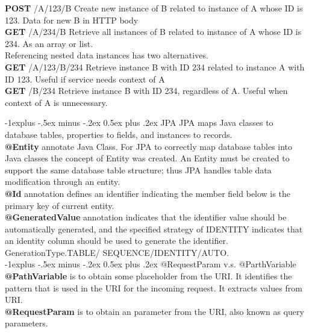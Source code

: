 \documentclass[10pt,landscape]{article}
\makeatletter
\renewcommand{\subsection}{\@startsection{subsection}{2}{0mm}%
                                {-1explus -.5ex minus -.2ex}%
                                {0.5ex plus .2ex}%
                                {\normalfont\normalsize\bfseries}}
\makeatother
\begin{document}
\begin{multicols}{3}
\textbf{POST}	/A/123/B	Create new instance of B related to instance of A whose ID is 123. Data for new B in HTTP body\\
\textbf{GET}		/A/234/B	Retrieve all instances of B related to instance of A whose ID is 234. As an array or list.\\

Referencing nested data instances has two alternatives.\\
\textbf{GET} /A/123/B/234 Retrieve instance B with ID 234 related to instance A with ID 123. Useful if service needs context of A\\
\textbf{GET} /B/234	Retrieve instance B with ID 234, regardless of A. Useful when context of A is unnecessary.


\subsection{JPA}
JPA maps Java classes to database tables, properties to fields, and instances to records.\\

\textbf{@Entity} annotate Java Class. For JPA to correctly map database tables into Java classes the concept of Entity was created. An Entity must be created to support the same database table structure; thus JPA handles table data modification through an entity.\\
\textbf{@Id} annotation defines an identifier indicating the member field below is the primary key of current entity.\\
\textbf{@GeneratedValue} annotation indicates that the identifier value should be automatically generated, and the specified strategy of IDENTITY indicates that an identity column should be used to generate the identifier. GenerationType.TABLE/ SEQUENCE/IDENTITY/AUTO.\\

\subsection{@RequestParam v.s. @ParthVariable}
\textbf{@PathVariable} is to obtain some placeholder from the URI. It identifies the pattern that is used in the URI for the incoming request. It extracts values from URI.\\
\textbf{@RequestParam} is to obtain an parameter from the URI, also known as query parameters. \\


\end{multicols}
\end{document}
